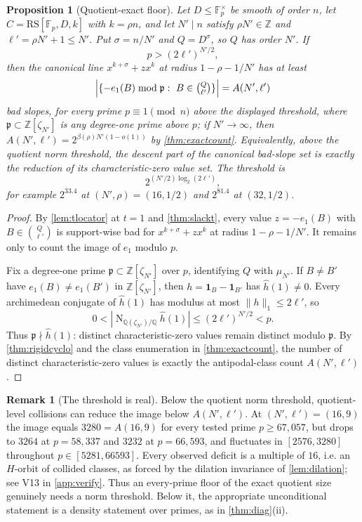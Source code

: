 \documentclass[11pt]{article}
\newtheorem{proposition}[proposition]{Proposition}
\theoremstyle{definition}
\newtheorem{remark}[remark]{Remark}
\newcommand{\F}{\mathbb F}
\newcommand{\Z}{\mathbb Z}
\newcommand{\Q}{\mathbb Q}
\newcommand{\RS}{\mathrm{RS}}
\newcommand{\Norm}{\operatorname{N}}
\newcommand{\Acl}{A}
\begin{document}
\begin{proposition}[Quotient-exact floor]\label{prop:qfloor}
Let $D\le\F_p^\times$ be smooth of order $n$, let $C=\RS[\F_p,D,k]$ with $k=\rho n$, and let $N'\mid n$ satisfy $\rho N'\in\Z$ and $\ell'=\rho N'+1\le N'$.  Put $\sigma=n/N'$ and $Q=D^\sigma$, so $Q$ has order $N'$.  If
\[
        p>(2\ell')^{N'/2},
\]
then the canonical line $x^{k+\sigma}+zx^k$ at radius $1-\rho-1/N'$ has at least
\[
        \left|\{-e_1(B)\bmod\mathfrak p:\ B\in\tbinom{Q}{\ell'}\}\right|
        =\Acl(N',\ell')
\]
bad slopes, for every prime $p\equiv1\pmod n$ above the displayed threshold, where $\mathfrak p\subset\Z[\zeta_{N'}]$ is any degree-one prime above $p$; if $N'\to\infty$, then $\Acl(N',\ell')=2^{\beta(\rho)N'(1-o(1))}$ by \cref{thm:exactcount}.  Equivalently, above the quotient norm threshold, the descent part of the canonical bad-slope set is exactly the reduction of its characteristic-zero value set.  The threshold is
\[
        2^{(N'/2)\log_2(2\ell')},
\]
for example $2^{33.4}$ at $(N',\rho)=(16,1/2)$ and $2^{81.4}$ at $(32,1/2)$.
\end{proposition}

\begin{proof}
By \cref{lem:tlocator} at $t=1$ and \cref{thm:slackt}, every value $z=-e_1(B)$ with $B\in\binom Q{\ell'}$ is support-wise bad for $x^{k+\sigma}+zx^k$ at radius $1-\rho-1/N'$.  It remains only to count the image of $e_1$ modulo $p$.

Fix a degree-one prime $\mathfrak p\subset\Z[\zeta_{N'}]$ over $p$, identifying $Q$ with $\mu_{N'}$.  If $B\ne B'$ have $e_1(B)\ne e_1(B')$ in $\Z[\zeta_{N'}]$, then $h=\mathbf 1_B-\mathbf 1_{B'}$ has $\widehat h(1)\ne0$.  Every archimedean conjugate of $\widehat h(1)$ has modulus at most $\|h\|_1\le2\ell'$, so
\[
        0<\left|\Norm_{\Q(\zeta_{N'})/\Q}\widehat h(1)\right|
        \le(2\ell')^{N'/2}<p.
\]
Thus $\mathfrak p\nmid\widehat h(1)$: distinct characteristic-zero values remain distinct modulo $\mathfrak p$.  By \cref{thm:rigidcyclo} and the class enumeration in \cref{thm:exactcount}, the number of distinct characteristic-zero values is exactly the antipodal-class count $\Acl(N',\ell')$.
\end{proof}

\begin{remark}[The threshold is real]\label{rem:thresholdneeded}
Below the quotient norm threshold, quotient-level collisions can reduce the image below $\Acl(N',\ell')$.  At $(N',\ell')=(16,9)$ the image equals $3280=\Acl(16,9)$ for every tested prime $p\ge 67{,}057$, but drops to $3264$ at $p=58{,}337$ and $3232$ at $p=66{,}593$, and fluctuates in $[2576,3280]$ throughout $p\in[5281,66593]$.  Every observed deficit is a multiple of $16$, i.e. an $H$-orbit of collided classes, as forced by the dilation invariance of \cref{lem:dilation}; see V13 in \cref{app:verify}.  Thus an every-prime floor of the exact quotient size genuinely needs a norm threshold.  Below it, the appropriate unconditional statement is a density statement over primes, as in \cref{thm:diag}(ii).
\end{remark}
\end{document}
